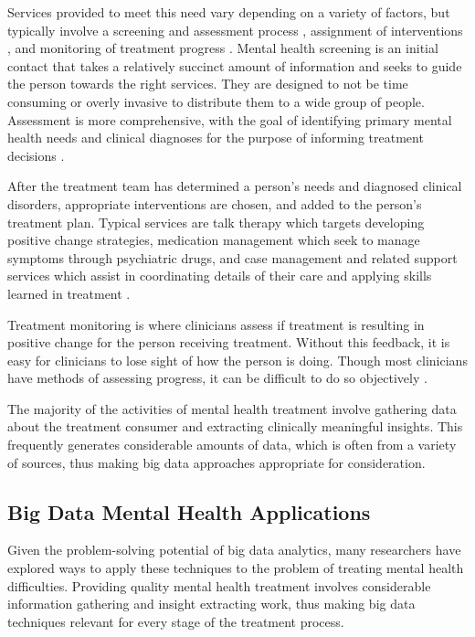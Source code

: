 \documentclass[sigconf]{acmart}
\begin{document}
Services provided to meet this need vary depending on a variety of factors, but typically involve a screening and assessment process \cite{apapractscreeassess}, assignment of interventions \cite{samhsatx}, and monitoring of treatment progress \cite{progressmonitoring}. Mental health screening is an initial contact that takes a relatively succinct amount of information and seeks to guide the person towards the right services. They are designed to not be time consuming or overly invasive to distribute them to a wide group of people. Assessment is more comprehensive, with the goal of identifying primary mental health needs and clinical diagnoses for the purpose of informing treatment decisions \cite{apapractscreeassess}.

After the treatment team has determined a person's needs and diagnosed clinical disorders, appropriate interventions are chosen, and added to the person's treatment plan. Typical services are talk therapy which targets developing positive change strategies, medication management which seek to manage symptoms through psychiatric drugs, and case management and related support services which assist in coordinating details of their care and applying skills learned in treatment \cite{samhsatx}. 

Treatment monitoring is where clinicians assess if treatment is resulting in positive change for the person receiving treatment. Without this feedback, it is easy for clinicians to lose sight of how the person is doing. Though most clinicians have methods of assessing progress, it can be difficult to do so objectively \cite{progressmonitoring}.

The majority of the activities of mental health treatment involve gathering data about the treatment consumer and extracting clinically meaningful insights. This frequently generates considerable amounts of data, which is often from a variety of sources, thus making big data approaches appropriate for consideration.

\subsection{Big Data Mental Health Applications}

Given the problem-solving potential of big data analytics, many researchers have explored ways to apply these techniques to the problem of treating mental health difficulties. Providing quality mental health treatment involves considerable information gathering and insight extracting work, thus making big data techniques relevant for every stage of the treatment process. 
\end{document}
